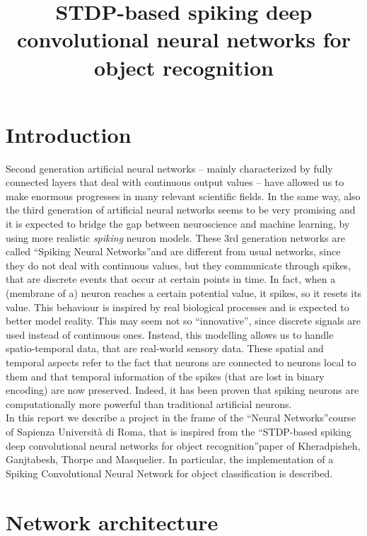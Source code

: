 \documentclass[11pt,a4paper]{scrartcl}
\date{}
\title{STDP-based spiking deep convolutional neural networks for object recognition}
\begin{document}


\tableofcontents

\clearpage
\section*{Introduction}
Second generation artificial neural networks -- mainly characterized by fully connected layers that deal with continuous output values -- have allowed us to make enormous progresses in many relevant scientific fields. In the same way, also the third generation of artificial neural networks seems to be very promising and it is expected to bridge the gap between neuroscience and machine learning, by using more realistic \textit{spiking} neuron models. These 3rd generation networks are called \textquotedblleft Spiking Neural Networks\textquotedblright and are different from usual networks, since they do not deal with continuous values, but they communicate through spikes, that are discrete events that occur at certain points in time. In fact, when a (membrane of a) neuron reaches a certain potential value, it spikes, so it resets its value.
This behaviour is inspired by real biological processes and is expected to better model reality. This may seem not so \textquotedblleft innovative\textquotedblright, since discrete signals are used instead of continuous ones. Instead, this modelling allows us to handle spatio-temporal data, that are real-world sensory data. These spatial and temporal aspects refer to the fact that neurons are connected to neurons local to them and that temporal information of the spikes (that are lost in binary encoding) are now preserved. Indeed, it has been proven that spiking neurons are computationally more powerful than traditional artificial neurons.\\
In this report we describe a project in the frame of the \textquotedblleft Neural Networks\textquotedblright course of Sapienza Università di Roma, that is inspired from the \textquotedblleft STDP-based spiking deep convolutional neural networks for object
recognition\textquotedblright paper of Kheradpisheh, Ganjtabesh, Thorpe and Masquelier. In particular, the implementation of a Spiking Convolutional Neural Network for object classification is described.

\section{Network architecture}
\end{document}
